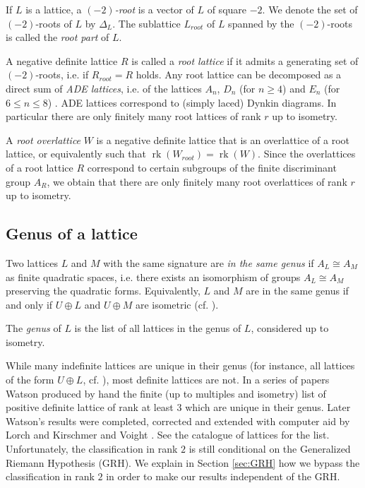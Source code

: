 \documentclass[11pt,letterpaper]{amsart}
\DeclareMathOperator{\rk}{rk}
\begin{document}
If $L$ is a lattice, a \emph{$(-2)$-root} is a vector of $L$ of square $-2$. We denote the set of $(-2)$-roots of $L$ by $\Delta_L$.
The sublattice $L_{root}$ of $L$ spanned by the $(-2)$-roots is called the \emph{root part} of $L$.

A negative definite lattice $R$ is called a \emph{root lattice} if it admits a generating set of $(-2)$-roots, i.e. if $R_{root}=R$ holds. Any root lattice can be decomposed as a direct sum of \emph{ADE lattices}, i.e. of the lattices $A_n$, $D_n$ (for $n\ge 4$) and $E_n$ (for $6\le n \le 8$) \cite[Theorem~1.2]{ebeling.lattices}. ADE lattices correspond to (simply laced) Dynkin diagrams. In particular there are only finitely many root lattices of rank $r$ up to isometry.

A \emph{root overlattice} $W$ is a negative definite lattice that is an overlattice of a root lattice, or equivalently such that $\rk(W_{root})=\rk(W)$. Since the overlattices of a root lattice $R$ correspond to certain subgroups of the finite discriminant group $A_R$, we obtain that there are only finitely many root overlattices of rank $r$ up to isometry.

\subsection{Genus of a lattice}

Two lattices $L$ and $M$ with the same signature are \emph{in the same genus} if $A_L\cong A_M$ as finite quadratic spaces, i.e. there exists an isomorphism of groups $A_L\cong A_M$ preserving the quadratic forms. 
Equivalently, $L$ and $M$ are in the same genus if and only if $U\oplus L$ and $U\oplus M$ are isometric (cf. {\cite[Corollary~1.13.4]{nikulin.integral.symmetric.bilinear}}).

The \emph{genus} of $L$ is the list of all lattices in the genus of $L$, considered up to isometry.

While many indefinite lattices are unique in their genus (for instance, all lattices of the form $U\oplus L$, cf. {\cite[Corollary~1.13.3]{nikulin.integral.symmetric.bilinear}}), most definite lattices are not. In a series of papers Watson produced by hand the finite (up to multiples and isometry) list of positive definite lattice of rank at least $3$ which are unique in their genus. Later Watson's results were completed, corrected and extended with computer aid by Lorch and Kirschmer \cite{lorch.kirschmer.single.class} and Voight \cite{voight}. See the catalogue of lattices \cite{catalogue} for the list. Unfortunately, the classification in rank $2$ is still conditional on the Generalized Riemann Hypothesis (GRH). We explain in Section \ref{sec:GRH} how we bypass the classification in rank $2$ in order to make our results independent of the GRH.
\end{document}
